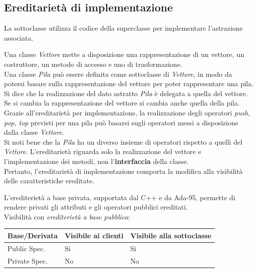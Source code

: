 \documentclass[12pt]{report}
\begin{document}
\subsection{Ereditarietà di implementazione}
La sottoclasse utilizza il codice della superclasse per implementare l'astrazione associata.
\begin{example}{}{}
Una classe \textit{Vettore} mette a disposizione una rappresentazione di un vettore, un costruttore, un metodo di accesso e uno di trasformazione. \\
Una classe \textit{Pila} può essere definita come sottoclasse di \textit{Vettore}, in modo da potersi basare sulla rappresentazione del vettore per poter rappresentare una pila. Si dice che la realizzazione del dato astratto \textit{Pila} è delegata a quella del vettore. Se si cambia la rappresentazione del vettore si cambia anche quella della pila. \\
Grazie all'ereditarietà per implementazione, la realizzazione degli operatori \textit{push, pop, top} previsti per una pila può basarsi sugli operatori messi a disposizione dalla classe \textit{Vettore}. \\
Si noti bene che la \textit{Pila} ha un diverso insieme di operatori rispetto a quelli del \textit{Vettore}. L'ereditarietà riguarda solo la realizzazione del vettore e l'implementazione dei metodi, non l'\textbf{interfaccia} della classe. \\
Pertanto, l'ereditarietà di implementazione comporta la modifica alla visibilità delle caratteristiche ereditate.
\end{example}
L'erediterietà a base privata, supportata dal C++ e da Ada-95, permette di rendere privati gli attributi e gli operatori pubblici ereditati. \\
Visibilità con \textit{erediterietà a base pubblica}:
\begin{table}
	\begin{center}
		\begin{tabular}[c]{|l|l|l|}
			\hline
			\multicolumn{1}{|c|}{\textbf{Base/Derivata}} &
			\multicolumn{1}{c|}{\textbf{Visibile ai clienti}} &
			\multicolumn{1}{c|}{\textbf{Visibile alla sottoclasse}} \\
			\hline
			Public Spec. & Si & Si \\
			\hline
			Private Spec. & No & No \\
			\hline
		\end{tabular}
	\end{center}
\end{table}
\end{document}
